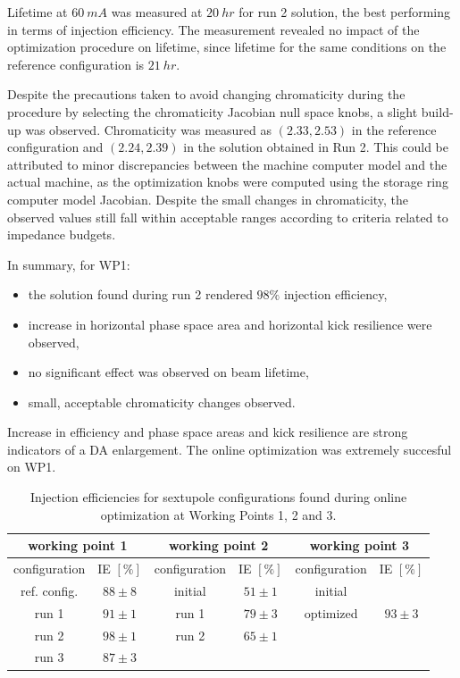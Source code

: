 Lifetime at $60~\unit{mA}$ was measured at $20~\unit{hr}$ for run 2 solution, the best performing in terms of injection efficiency. The measurement revealed no impact of the optimization procedure on lifetime, since lifetime for the same conditions on the reference configuration is $21~\unit{hr}$.

Despite the precautions taken to avoid changing chromaticity during the procedure by selecting the chromaticity Jacobian null space knobs, a slight build-up was observed. Chromaticity was measured as $(2.33, 2.53)$ in the reference configuration and $(2.24, 2.39)$ in the solution obtained in Run 2. This could be attributed to minor discrepancies between the machine computer model and the actual machine, as the optimization knobs were computed using the storage ring computer model Jacobian. Despite the small changes in chromaticity, the observed values still fall within acceptable ranges according to criteria related to impedance budgets.

In summary, for WP1:
\begin{itemize}
    \item the solution found during run 2 rendered $98\%$ injection efficiency,
    \item increase in horizontal phase space area and horizontal kick resilience were observed,
    \item no significant effect was observed on beam lifetime,
    \item small, acceptable chromaticity changes observed.
\end{itemize}
Increase in efficiency and phase space areas and kick resilience are strong indicators of a DA enlargement. The online optimization was extremely succesful on WP1.

\begin{table}[htb]
    \caption{Injection efficiencies for sextupole configurations found during online optimization at Working Points 1, 2 and 3.}
    \centering
    \begin{tabular}{cccccc}
    \hline
    \multicolumn{2}{c}{working point 1} & \multicolumn{2}{c}{working point 2}         & \multicolumn{2}{c}{working point 3}         \\ \hline
    configuration      & IE $[\%]$      & configuration        & IE $[\%]$            & configuration        & IE $[\%]$            \\ \hline
    ref. config.       & $88\pm8$       & initial              & $51\pm1$             & initial              &                      \\
    run 1              & $91\pm1$       & run 1                & $79\pm3$             & optimized            & $93\pm3$             \\
    run 2              & $98\pm1$       & run 2                & $65\pm1    $         &                      &                      \\
    run 3              & $87\pm3$       & \multicolumn{1}{l}{} & \multicolumn{1}{l}{} & \multicolumn{1}{l}{} & \multicolumn{1}{l}{} \\ \hline
    \end{tabular}
    \label{table1}
    \end{table}

